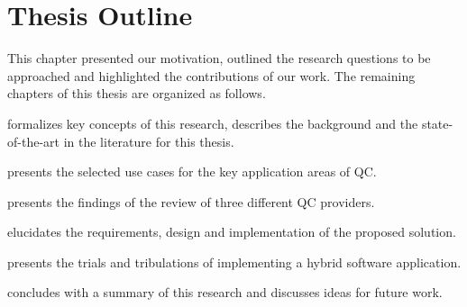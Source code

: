 \section{Thesis Outline}
\label{sect:introduction--thesis-outline}
This chapter presented our motivation, outlined the research questions to be approached and highlighted the contributions of our work. The remaining chapters of this thesis are organized as follows.

\begin{description}[leftmargin=3.5em]
	\item[Chapter 2:] formalizes key concepts of this research, describes the background and the state-of-the-art in the literature for this thesis.
	\item[Chapter 3:] presents the selected use cases for the key application areas of QC.
    \item[Chapter 4:] presents the findings of the review of three different QC providers.
    \item[Chapter 5:] elucidates the requirements, design and implementation of the proposed solution.
    \item[Chapter 6:] presents the trials and tribulations of implementing a hybrid software application.
    \item[Chapter 7:] concludes with a summary of this research and discusses ideas for future work.
\end{description}